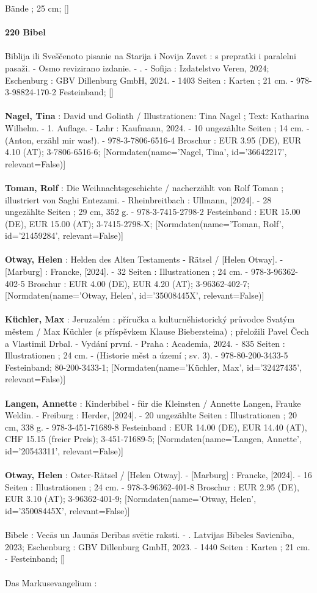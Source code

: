 \documentclass{article}
\begin{document}
\begin{multicols}{3}
Bände ; 25 cm; []\\\\\textbf{220 Bibel}\\\\Biblija ili Sveščenoto pisanie na Starija i Novija Zavet : s prepratki i paralelni pasaži. - Osmo revizirano izdanie. - . - Sofija : Izdatelstvo Veren, 2024; Eschenburg : GBV Dillenburg GmbH, 2024. - 1403 Seiten : Karten ; 21 cm. - 978-3-98824-170-2 Festeinband; []\\\\\textbf{Nagel, Tina} : David und Goliath / Illustrationen: Tina Nagel ; Text: Katharina Wilhelm. - 1. Auflage. - Lahr : Kaufmann, 2024. - 10 ungezählte Seiten ; 14 cm. - (Anton, erzähl mir was!). - 978-3-7806-6516-4 Broschur : EUR 3.95 (DE), EUR 4.10 (AT); 3-7806-6516-6; [Normdaten(name='Nagel, Tina', id='36642217', relevant=False)]\\\\\textbf{Toman, Rolf} : Die Weihnachtsgeschichte / nacherzählt von Rolf Toman ; illustriert von Saghi Entezami. - Rheinbreitbach : Ullmann, [2024]. - 28 ungezählte Seiten ; 29 cm, 352 g. - 978-3-7415-2798-2 Festeinband : EUR 15.00 (DE), EUR 15.00 (AT); 3-7415-2798-X; [Normdaten(name='Toman, Rolf', id='21459284', relevant=False)]\\\\\textbf{Otway, Helen} : Helden des Alten Testaments - Rätsel / [Helen Otway]. - [Marburg] : Francke, [2024]. - 32 Seiten : Illustrationen ; 24 cm. - 978-3-96362-402-5 Broschur : EUR 4.00 (DE), EUR 4.20 (AT); 3-96362-402-7; [Normdaten(name='Otway, Helen', id='35008445X', relevant=False)]\\\\\textbf{Küchler, Max} : Jeruzalém : příručka a kulturněhistorický průvodce Svatým městem / Max Küchler (s příspěvkem Klause Biebersteina) ; přeložili Pavel Čech a Vlastimil Drbal. - Vydání první. - Praha : Academia, 2024. - 835 Seiten : Illustrationen ; 24 cm. - (Historie měst a území ; sv. 3). - 978-80-200-3433-5 Festeinband; 80-200-3433-1; [Normdaten(name='Küchler, Max', id='32427435', relevant=False)]\\\\\textbf{Langen, Annette} : Kinderbibel - für die Kleinsten / Annette Langen, Frauke Weldin. - Freiburg : Herder, [2024]. - 20 ungezählte Seiten : Illustrationen ; 20 cm, 338 g. - 978-3-451-71689-8 Festeinband : EUR 14.00 (DE), EUR 14.40 (AT), CHF 15.15 (freier Preis); 3-451-71689-5; [Normdaten(name='Langen, Annette', id='20543311', relevant=False)]\\\\\textbf{Otway, Helen} : Oster-Rätsel / [Helen Otway]. - [Marburg] : Francke, [2024]. - 16 Seiten : Illustrationen ; 24 cm. - 978-3-96362-401-8 Broschur : EUR 2.95 (DE), EUR 3.10 (AT); 3-96362-401-9; [Normdaten(name='Otway, Helen', id='35008445X', relevant=False)]\\\\Bībele : Vecās un Jaunās Derības svētie raksti. - .  Latvijas Bībeles Savienība, 2023; Eschenburg : GBV Dillenburg GmbH, 2023. - 1440 Seiten : Karten ; 21 cm. - Festeinband; []\\\\Das Markusevangelium : 
\end{multicols}
\end{document}
